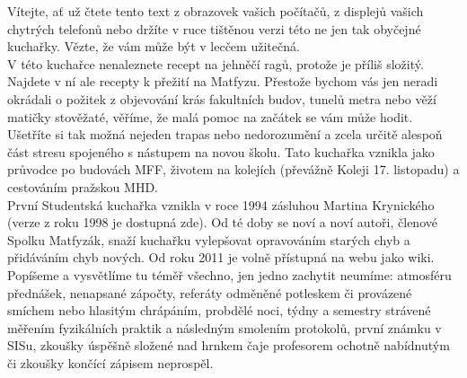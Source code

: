 Vítejte, ať už čtete tento text z obrazovek vašich počítačů,
z displejů vašich chytrých telefonů nebo držíte v ruce tištěnou verzi této ne
jen tak obyčejné kuchařky. Vězte, že vám může být v lecčem užitečná.
\\
V této kuchařce nenaleznete recept na jehněčí ragů, protože je příliš složitý.
Najdete v ní ale recepty k přežití na Matfyzu.
Přestože bychom vás jen neradi okrádali o požitek z objevování krás
fakultních budov, tunelů metra nebo věží matičky stověžaté, věříme,
že malá pomoc na začátek se vám může hodit.
Ušetříte si tak možná nejeden trapas nebo nedorozumění a zcela určitě
alespoň část stresu spojeného s nástupem na novou školu.
Tato kuchařka vznikla jako průvodce po budovách MFF,
životem na kolejích (převážně Koleji 17. listopadu) a cestováním pražskou MHD.
\\
První Studentská kuchařka vznikla v roce 1994 zásluhou Martina Krynického
(verze z roku 1998 je dostupná zde).
Od té doby se noví a noví autoři, členové Spolku Matfyzák,
snaží kuchařku vylepšovat opravováním starých chyb a přidáváním chyb nových.
Od roku 2011 je volně přístupná na webu jako wiki.
\\
Popíšeme a vysvětlíme tu téměř všechno, jen jedno zachytit neumíme:
atmosféru přednášek, nenapsané zápočty, referáty odměněné potleskem
či provázené smíchem nebo hlasitým chrápáním, probdělé noci,
týdny a semestry strávené měřením fyzikálních praktik a následným
smolením protokolů, první známku v SISu, zkoušky úspěšně složené
nad hrnkem čaje profesorem ochotně nabídnutým či zkoušky končící
zápisem neprospěl.